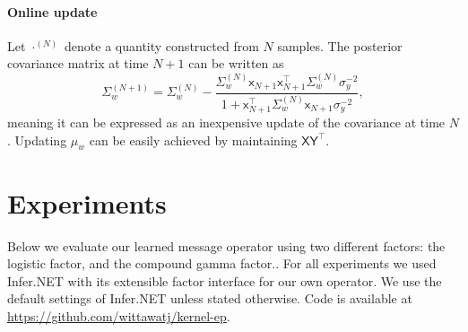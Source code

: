 \documentclass[english]{article}
\theoremstyle{plain}
\theoremstyle{plain}
\newcommand{\feax}{\mathsf{x}}
\newcommand{\feaX}{\mathsf{X}}
\newcommand{\feay}{\mathsf{y}}
\newcommand{\feaY}{\mathsf{Y}}
\newcommand{\wjnote}[1]{ }
\begin{document}
\paragraph{Online update}
Let $\cdot^{(N)}$ denote a quantity constructed from $N$ samples. The posterior
covariance matrix at time $N+1$ can be written as
%
\begin{equation}
\Sigma_{w}^{(N+1)} 
 =
\Sigma_{w}^{(N)}-\frac{\Sigma_{w}^{(N)} \mathsf{x}_{N+1} \mathsf{x}_{N+1}^{\top} \Sigma_{w}^{(N)}\sigma_{y}^{-2}}{1+ \mathsf{x}_{N+1}^{\top}\Sigma_{w}^{(N)} \mathsf{x}_{N+1}\sigma_{y}^{-2}},
\end{equation}
meaning it can be expressed as an inexpensive update of the covariance at time
$N$.
Updating $\mu_{w}$ can be easily achieved by maintaining  $\feaX \feaY^{\top}$. 



\section{Experiments  \label{sec:Experiments}}

Below we evaluate our learned message operator using two different factors: the
logistic factor, and the compound gamma factor..  For all experiments we used
Infer.NET \citep{Minka2014} with its extensible factor interface for our own
operator.  We use the default settings of Infer.NET unless stated otherwise.  
Code is available at \url{https://github.com/wittawatj/kernel-ep}.
\end{document}
